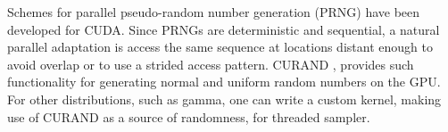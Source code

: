 Schemes for parallel pseudo-random number generation (PRNG) have been
developed for CUDA. Since PRNGs are deterministic and sequential, a
natural parallel adaptation is access the same sequence at locations
distant enough to avoid overlap or to use a strided access
pattern. CURAND \cite{curand}, provides such functionality for generating
normal and uniform random numbers on the GPU. For other distributions,
such as gamma,
one can write a custom kernel, making use of CURAND as a source of
randomness, for threaded sampler.

